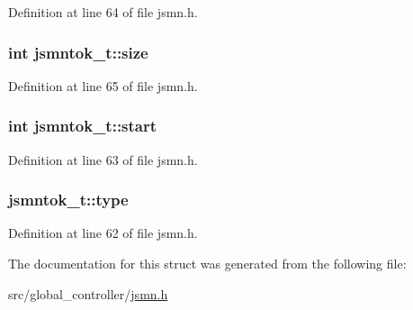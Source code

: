 Definition at line 64 of file jsmn.\-h.

\hypertarget{structjsmntok__t_a8ac3694b7335456c8e602197778883db}{
\subsubsection[{size}]{\setlength{\rightskip}{0pt plus 5cm}int jsmntok\-\_\-t\-::size}}\label{structjsmntok__t_a8ac3694b7335456c8e602197778883db}


Definition at line 65 of file jsmn.\-h.

\hypertarget{structjsmntok__t_a0a8f55d0095f268ce8e224fe1234acd0}{
\subsubsection[{start}]{\setlength{\rightskip}{0pt plus 5cm}int jsmntok\-\_\-t\-::start}}\label{structjsmntok__t_a0a8f55d0095f268ce8e224fe1234acd0}


Definition at line 63 of file jsmn.\-h.

\hypertarget{structjsmntok__t_ac03dbd6b83cbcd979eb64702d5b9943e}{
\subsubsection[{type}]{ jsmntok\-\_\-t\-::type}}\label{structjsmntok__t_ac03dbd6b83cbcd979eb64702d5b9943e}


Definition at line 62 of file jsmn.\-h.



The documentation for this struct was generated from the following file\-:\begin{DoxyCompactItemize}
\item 
src/global\-\_\-controller/\hyperlink{global__controller_2jsmn_8h}{jsmn.\-h}\end{DoxyCompactItemize}

